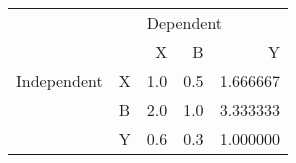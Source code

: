 \begin{tabular}{llrrr}
\toprule
            &   & \multicolumn{3}{l}{Dependent} \\
            &   &         X &    B &         Y \\
\midrule
Independent & X &       1.0 &  0.5 &  1.666667 \\
            & B &       2.0 &  1.0 &  3.333333 \\
            & Y &       0.6 &  0.3 &  1.000000 \\
\bottomrule
\end{tabular}

